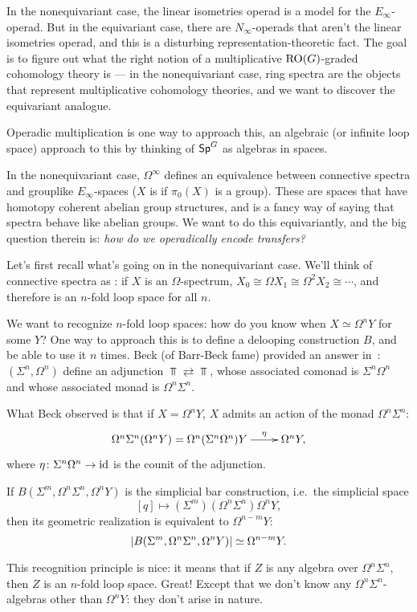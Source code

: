 In the nonequivariant case, the linear isometries operad is a model for the $E_\infty$-operad. But in the
equivariant case, there are $N_\infty$-operads that aren't the linear isometries operad, and this is a disturbing
representation-theoretic fact. The goal is to figure out what the right notion of a multiplicative $\mathrm{RO}(G)$-graded
cohomology theory is --- in the nonequivariant case, ring spectra are the objects that represent multiplicative
cohomology theories, and we want to discover the equivariant analogue.

Operadic multiplication is one way to approach this, an algebraic (or infinite loop space) approach to this by
thinking of $\mathsf{Sp}^G$ as algebras in spaces.

In the nonequivariant case, $\Omega^\infty$ defines an equivalence between connective spectra and grouplike $E_\infty$-spaces ($X$ is  if $\pi_0(X)$ is a
group). These are spaces that have homotopy coherent abelian group structures, and is a fancy way of saying that
spectra behave like abelian groups. We want to do this equivariantly, and the big question therein is: \emph{how do
we operadically encode transfers?}

Let's first recall what's going on in the nonequivariant case. We'll think of connective spectra as
: if $X$ is an $\Omega$-spectrum, $X_0 \cong \Omega X_1 \cong
\Omega^2 X_2 \cong \dotsb$, and therefore is an $n$-fold loop space for all $n$.

We want to recognize $n$-fold loop spaces: how do you know when $X\simeq\Omega^n Y$ for some $Y$? One way to
approach this is to define a delooping construction $B$, and be able to use it $n$ times. Beck (of Barr-Beck fame)
provided an answer in~\cite{Beck}: $(\Sigma^n, \Omega^n)$ define an adjunction $\Top\rightleftarrows\Top$, whose
associated comonad is $\Sigma^n\Omega^n$ and whose associated monad is $\Omega^n\Sigma^n$.

What Beck observed is that if $X = \Omega^n Y$, $X$ admits an action of the monad $\Omega^n\Sigma^n$:
\[\xymatrix{
	\Omega^n\Sigma^n (\Omega^n Y) = \Omega^n (\Sigma^n\Omega^n) Y\ar[r]^-\eta &\Omega^n Y,
}\]
where $\eta\colon\Sigma^n\Omega^n\to\mathrm{id}$ is the counit of the adjunction.
\begin{thm}
If $B(\Sigma^m, \Omega^n\Sigma^n, \Omega^n Y)$ is the simplicial bar construction, i.e.\ the simplicial
space
\[[q]\mapsto (\Sigma^m)(\Omega^n\Sigma^n)\Omega^n Y,\]
then its geometric realization is equivalent to $\Omega^{n-m}Y$:
\[\lvert B(\Sigma^m, \Omega^n\Sigma^n, \Omega^n Y)\rvert\simeq \Omega^{n-m}Y.\]
\end{thm}
This recognition principle is nice: it means that if $Z$ is any algebra over $\Omega^n\Sigma^n$, then $Z$ is an
$n$-fold loop space. Great! Except that we don't know any $\Omega^n\Sigma^n$-algebras other than $\Omega^n Y$: they
don't arise in nature.

